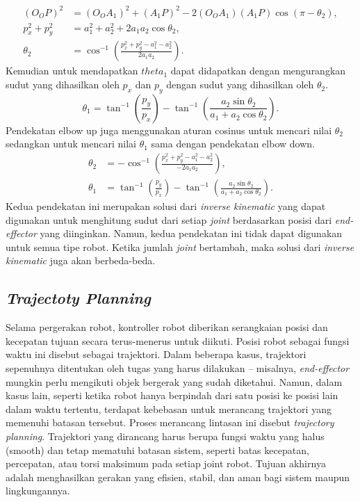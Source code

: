 \begin{equation}
  \label{eq:ElbowDownTheta2}
  \begin{aligned}
    (O_O P)^2 & = (O_O A_1)^2 + (A_1 P)^2 - 2(O_O A_1)(A_1 P)\cos(\pi - \theta_2), \\
    p_x^2 + p_y^2 & = a_1^2 + a_2^2 + 2a_1a_2\cos\theta_2, \\
    \theta_2 & = \cos^{-1}\left(\frac{p_x^2 + p_y^2 - a_1^2 - a_2^2}{2a_1a_2}\right).
  \end{aligned}
\end{equation}
Kemudian untuk mendapatkan $theta_1$ dapat didapatkan dengan mengurangkan sudut yang
dihasilkan oleh $p_x$ dan $p_y$ dengan sudut yang dihasilkan oleh $\theta_2$.
\begin{equation}
  \label{eq ElbowDownTheta1}
  \theta_1 = \tan^{-1}\left(\frac{p_y}{p_x}\right) - \tan^{-1}\left(\frac{a_2\sin\theta_2}{a_1 + a_2\cos\theta_2}\right).
\end{equation}
Pendekatan elbow up juga menggunakan aturan cosinus untuk mencari nilai $\theta_2$ sedangkan
untuk mencari nilai $\theta_1$ sama dengan pendekatan elbow down. 
\begin{equation}
  \label{eq:ElbowUpTheta2}
  \begin{aligned}
    \theta_2 & = -\cos^{-1}\left(\frac{p_x^2 + p_y^2 - a_1^2 - a_2^2}{-2a_1a_2}\right),\\
    \theta_1 & = \tan^{-1}\left(\frac{p_y}{p_x}\right) - \tan^{-1}\left(\frac{a_2\sin\theta_2}{a_1 + a_2\cos\theta_2}\right).
  \end{aligned} 
\end{equation}
Kedua pendekatan ini merupakan solusi dari \emph{inverse kinematic} yang dapat digunakan
untuk menghitung sudut dari setiap \emph{joint} berdasarkan posisi dari \emph{end-effector}
yang diinginkan. Namun, kedua pendekatan ini tidak dapat digunakan untuk semua tipe robot.
Ketika jumlah \emph{joint} bertambah, maka solusi dari \emph{inverse kinematic} juga akan
berbeda-beda.

\subsection{\emph{Trajectoty Planning}}
Selama pergerakan robot, kontroller robot diberikan serangkaian posisi dan kecepatan tujuan 
secara terus-menerus untuk diikuti. Posisi robot sebagai fungsi waktu ini disebut
sebagai trajektori. Dalam beberapa kasus, trajektori sepenuhnya ditentukan oleh tugas yang 
harus dilakukan – misalnya, \emph{end-effector} mungkin perlu mengikuti objek bergerak yang 
sudah diketahui. Namun, dalam kasus lain, seperti ketika robot hanya berpindah dari satu 
posisi ke posisi lain dalam waktu tertentu, terdapat kebebasan untuk merancang 
trajektori yang memenuhi batasan tersebut. Proses merancang lintasan  ini disebut 
\emph{trajectory planning}. Trajektori yang dirancang harus berupa fungsi waktu
yang halus (smooth) dan tetap mematuhi batasan sistem, seperti batas kecepatan,
percepatan, atau torsi maksimum pada setiap joint robot. Tujuan akhirnya adalah
menghasilkan gerakan yang efisien, stabil, dan aman bagi sistem maupun
lingkungannya. \parencite{ModernRobotics}


